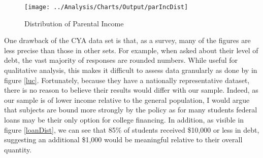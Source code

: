 \documentclass{article}
\begin{document}
	\begin{figure}
		\centering
		\caption{Distribution of Parental Income}
		\label{incDist}
		\texttt{[image: ../Analysis/Charts/Output/parIncDist]}
	\end{figure}
	
	One drawback of the CYA data set is that, as a survey, many of the figures are less precise than those in other sets. For example, when asked about their level of debt, the vast majority of responses are rounded numbers. While useful for qualitative analysis, this makes it difficult to assess data granularly as done by \textcite{lucca2018} in figure \ref{luc}. Fortunately, because they have a nationally representative dataset, there is no reason to believe their results would differ with our sample. Indeed, as our sample is of lower income relative to the general population, I would argue that subjects are bound more strongly by the policy as for many students federal loans may be their only option for college financing. In addition, as visible in figure \ref{loanDist}, we can see that 85\% of students received \$10,000 or less in debt, suggesting an additional \$1,000 would be meaningful relative to their overall quantity. 
	
\end{document}
